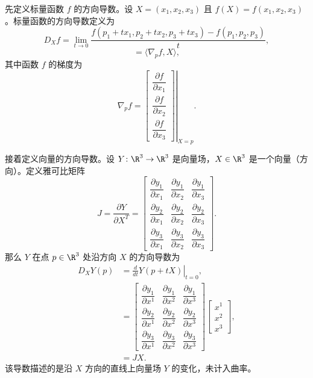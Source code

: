 先定义标量函数 $f$ 的方向导数。设 $X=(x_1,x_2,x_3)$ 且 $f(X)=f(x_1,x_2,x_3)$。标量函数的方向导数定义为
\begin{equation*}
  D_X f=\lim_{t\to0}
    \frac{f(p_1+tx_1,p_2+tx_2,p_3+tx_3)-f(p_1,p_2,p_3)}{t},
  \tag{6A1}\label{eq:6A1}
\end{equation*}
\begin{equation*}
  =\langle\nabla_p f,X\rangle,
  \tag{6A2}\label{eq:6A2}
\end{equation*}
其中函数 $f$ 的梯度为
\[
  \nabla_p f=\left.
  \begin{bmatrix}
  \dfrac{\partial f}{\partial x_1}\\[4pt]
  \dfrac{\partial f}{\partial x_2}\\[4pt]
  \dfrac{\partial f}{\partial x_3}
  \end{bmatrix}\right|_{X=p}.
\]

接着定义向量的方向导数。设 $Y\colon\R^3\to\R^3$ 是向量场，$X\in\R^3$ 是一个向量（方向）。定义雅可比矩阵
\[
  J=\frac{\partial Y}{\partial X^T}=
    \begin{bmatrix}
      \dfrac{\partial y_1}{\partial x_1}&
      \dfrac{\partial y_1}{\partial x_2}&
      \dfrac{\partial y_1}{\partial x_3}\\[4pt]
      \dfrac{\partial y_2}{\partial x_1}&
      \dfrac{\partial y_2}{\partial x_2}&
      \dfrac{\partial y_2}{\partial x_3}\\[4pt]
      \dfrac{\partial y_3}{\partial x_1}&
      \dfrac{\partial y_3}{\partial x_2}&
      \dfrac{\partial y_3}{\partial x_3}
    \end{bmatrix}.
\]
那么 $Y$ 在点 $p\in\R^3$ 处沿方向 $X$ 的方向导数为
\begin{equation*}
\begin{aligned}
  D_XY(p)
    &=\left.\frac{d}{dt}Y(p+tX)\right|_{t=0},\\
    &=\begin{bmatrix}
      \dfrac{\partial y_1}{\partial x^1}&
      \dfrac{\partial y_1}{\partial x^2}&
      \dfrac{\partial y_1}{\partial x^3}\\[4pt]
      \dfrac{\partial y_2}{\partial x^1}&
      \dfrac{\partial y_2}{\partial x^2}&
      \dfrac{\partial y_2}{\partial x^3}\\[4pt]
      \dfrac{\partial y_3}{\partial x^1}&
      \dfrac{\partial y_3}{\partial x^2}&
      \dfrac{\partial y_3}{\partial x^3}
    \end{bmatrix}
    \begin{bmatrix}x^1\\x^2\\x^3\end{bmatrix},\\
    &=JX.
\end{aligned}
\tag{6A3}\label{eq:6A3}
\end{equation*}
该导数描述的是沿 $X$ 方向的直线上向量场 $Y$ 的变化，未计入曲率。

